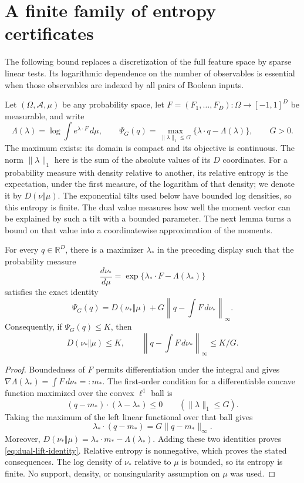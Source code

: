\section{A finite family of entropy certificates}\label{sec:sparse-dual}
The following bound replaces a discretization of the full feature space by
sparse linear tests. Its logarithmic dependence on the number of observables
is essential when those observables are indexed by all pairs of Boolean
inputs.

Let $(\Omega,\mathcal A,\mu)$ be any probability space, let
$F=(F_1,\ldots,F_D):\Omega\to[-1,1]^D$ be measurable, and write
\[
 \Lambda(\lambda)=\log\int e^{\lambda\cdot F}\,d\mu,
 \qquad
 \Psi_G(q)=\max_{\|\lambda\|_1\leq G}
       \{\lambda\cdot q-\Lambda(\lambda)\},\qquad G>0.
\]
The maximum exists: its domain is compact and its objective is continuous.
The norm $\|\lambda\|_1$ here is the sum of the absolute values of its
$D$ coordinates.
For a probability measure with density relative to another, its relative
entropy is the expectation, under the first measure, of the logarithm of
that density; we denote it by $D(\nu\Vert\mu)$. The exponential tilts used
below have bounded log densities, so this entropy is finite.
The dual value measures how well the moment vector can be explained by
such a tilt with a bounded parameter. The next lemma turns a bound on
that value into a coordinatewise approximation of the moments.

\begin{lemma}
\label{lem:bounded-dual-lift}
For every $q\in\mathbb R^D$, there is a maximizer $\lambda_*$ in the
preceding display such that the probability measure
\[
 \frac{d\nu_*}{d\mu}
     =\exp\{\lambda_*\cdot F-\Lambda(\lambda_*)\}
\]
satisfies the exact identity
\begin{equation}\label{eq:dual-lift-identity}
 \Psi_G(q)
   =D(\nu_*\Vert\mu)
      +G\left\|q-\int F\,d\nu_*\right\|_\infty.
\end{equation}
Consequently, if $\Psi_G(q)\leq K$, then
\[
 D(\nu_*\Vert\mu)\leq K,
 \qquad
 \left\|q-\int F\,d\nu_*\right\|_\infty\leq K/G.
\]
\end{lemma}
\begin{proof}
Boundedness of $F$ permits differentiation under the integral and gives
$\nabla\Lambda(\lambda_*)=\int F\,d\nu_*=:m_*$. The first-order
condition for a differentiable concave function maximized over the convex
$\ell^1$ ball is
\[
 (q-m_*)\cdot(\lambda-\lambda_*)\leq0
       \qquad(\|\lambda\|_1\leq G).
\]
Taking the maximum of the left linear functional over that ball gives
\[
 \lambda_*\cdot(q-m_*)=G\|q-m_*\|_\infty.
\]
Moreover,
$D(\nu_*\Vert\mu)=\lambda_*\cdot m_*-\Lambda(\lambda_*)$.
Adding these two identities proves \eqref{eq:dual-lift-identity}.
Relative entropy is nonnegative, which proves the stated consequences.
The log density of $\nu_*$ relative to $\mu$ is bounded, so its entropy
is finite. No support, density, or nonsingularity assumption on $\mu$
was used.
\end{proof}

